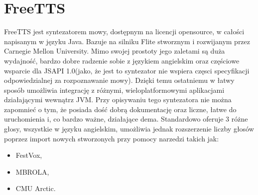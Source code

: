 \section{FreeTTS}
FreeTTS jest syntezatorem mowy, dostępnym na licencji opensource, w całości napisanym w języku Java. Bazuje na silniku Flite stworznym i rozwijanym przez Carnegie Mellon University. Mimo swojej prostoty jego zaletami są duża wydajność, bardzo dobre radzenie sobie z językiem angielskim oraz częściowe wsparcie dla JSAPI 1.0(jako, że jest to syntezator nie wspiera częsci specyfikacji odpowiedzialnej za rozpoznawanie mowy). Dzięki temu ostatniemu w łatwy sposób umożliwia integrację z różnymi, wieloplatformowymi aplikacjami działającymi wewnątrz JVM. Przy opisywaniu tego syntezatora nie można zapomnieć o tym, że posiada dość dobrą dokumentację oraz liczne, łatwe do uruchomienia i, co bardzo ważne, działające dema. Standardowo oferuje 3 różne głosy, wszystkie w języku angielskim, umożliwia jednak rozszerzenie liczby głosów poprzez import nowych stworzonych przy pomocy narzedzi takich jak:
\begin{itemize}
	\item FestVox,
	\item MBROLA,
	\item CMU Arctic.
\end{itemize}    

